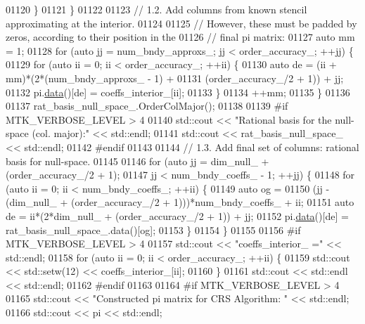 \begin{DoxyCode}
{{01120     \}
01121   \}
01122 
01123   \textcolor{comment}{// 1.2. Add columns from known stencil approximating at the interior.}
01124 
01125   \textcolor{comment}{// However, these must be padded by zeros, according to their position in the}
01126   \textcolor{comment}{// final pi matrix:}
01127   \textcolor{keyword}{auto} mm = 1;
01128   \textcolor{keywordflow}{for} (\textcolor{keyword}{auto} jj = num\_bndy\_approxs\_; jj < order\_accuracy\_; ++jj) \{
01129     \textcolor{keywordflow}{for} (\textcolor{keyword}{auto} ii = 0; ii < order\_accuracy\_; ++ii) \{
01130       \textcolor{keyword}{auto} de = (ii + mm)*(2*(num\_bndy\_approxs\_ - 1) +
01131         (order\_accuracy\_/2 + 1)) + jj;
01132       pi.\hyperlink{classmtk_1_1DenseMatrix_a0c33b8a9e01d157c61ddbdf807c25d84}{data}()[de] = coeffs\_interior\_[ii];
01133     \}
01134     ++mm;
01135   \}
01136 
01137   rat\_basis\_null\_space\_.OrderColMajor();
01138 
01139 \textcolor{preprocessor}{  #if MTK\_VERBOSE\_LEVEL > 4}
01140   std::cout << \textcolor{stringliteral}{"Rational basis for the null-space (col. major):"} << std::endl;
01141   std::cout << rat\_basis\_null\_space\_ << std::endl;
01142 \textcolor{preprocessor}{  #endif}
01143 
01144   \textcolor{comment}{// 1.3. Add final set of columns: rational basis for null-space.}
01145 
01146   \textcolor{keywordflow}{for} (\textcolor{keyword}{auto} jj = dim\_null\_ + (order\_accuracy\_/2 + 1);
01147        jj < num\_bndy\_coeffs\_ - 1; ++jj) \{
01148     \textcolor{keywordflow}{for} (\textcolor{keyword}{auto} ii = 0; ii < num\_bndy\_coeffs\_; ++ii) \{
01149       \textcolor{keyword}{auto} og =
01150         (jj - (dim\_null\_ + (order\_accuracy\_/2 + 1)))*num\_bndy\_coeffs\_ + ii;
01151       \textcolor{keyword}{auto} de = ii*(2*dim\_null\_ + (order\_accuracy\_/2 + 1)) + jj;
01152       pi.\hyperlink{classmtk_1_1DenseMatrix_a0c33b8a9e01d157c61ddbdf807c25d84}{data}()[de] = rat\_basis\_null\_space\_.data()[og];
01153     \}
01154   \}
01155 
01156 \textcolor{preprocessor}{  #if MTK\_VERBOSE\_LEVEL > 4}
01157   std::cout << \textcolor{stringliteral}{"coeffs\_interior\_ ="} << std::endl;
01158   \textcolor{keywordflow}{for} (\textcolor{keyword}{auto} ii = 0; ii < order\_accuracy\_; ++ii) \{
01159     std::cout << std::setw(12) << coeffs\_interior\_[ii];
01160   \}
01161   std::cout << std::endl << std::endl;
01162 \textcolor{preprocessor}{  #endif}
01163 
01164 \textcolor{preprocessor}{  #if MTK\_VERBOSE\_LEVEL > 4}
01165   std::cout << \textcolor{stringliteral}{"Constructed pi matrix for CRS Algorithm: "} << std::endl;
01166   std::cout << pi << std::endl;
}}
\end{DoxyCode}
